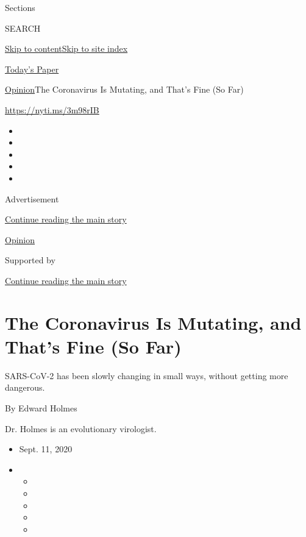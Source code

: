Sections

SEARCH

\protect\hyperlink{site-content}{Skip to
content}\protect\hyperlink{site-index}{Skip to site index}

\href{https://myaccount.nytimes3xbfgragh.onion/auth/login?response_type=cookie\&client_id=vi}{}

\href{https://www.nytimes3xbfgragh.onion/section/todayspaper}{Today's
Paper}

\href{/section/opinion}{Opinion}\textbar{}The Coronavirus Is Mutating,
and That's Fine (So Far)

\url{https://nyti.ms/3m98rIB}

\begin{itemize}
\item
\item
\item
\item
\item
\end{itemize}

Advertisement

\protect\hyperlink{after-top}{Continue reading the main story}

\href{/section/opinion}{Opinion}

Supported by

\protect\hyperlink{after-sponsor}{Continue reading the main story}

\hypertarget{the-coronavirus-is-mutating-and-thats-fine-so-far}{%
\section{The Coronavirus Is Mutating, and That's Fine (So
Far)}\label{the-coronavirus-is-mutating-and-thats-fine-so-far}}

SARS-CoV-2 has been slowly changing in small ways, without getting more
dangerous.

By Edward Holmes

Dr. Holmes is an evolutionary virologist.

\begin{itemize}
\item
  Sept. 11, 2020
\item
  \begin{itemize}
  \item
  \item
  \item
  \item
  \item
  \end{itemize}
\end{itemize}

